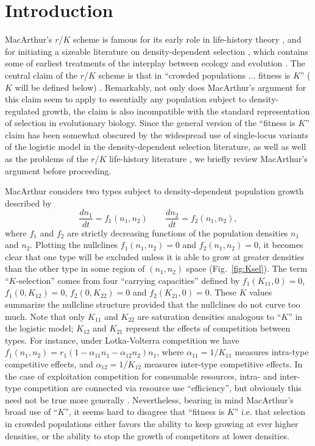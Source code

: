 \documentclass[11pt]{article}
\begin{document}
\section*{Introduction}



MacArthur's $r$/$K$ scheme \citep{macarthur_1962,macarthur_1967} is famous for its early role in life-history theory \citep{charlesworth_1994,reznick_2002}, and for initiating a sizeable literature on density-dependent selection \citep{christiansen_2004}, which contains some of earliest treatments of the interplay between ecology and evolution \citep{roughgarden_1979,travis_2013}. The central claim of the $r$/$K$ scheme is that in ``crowded populations ... fitness is $K$'' ($K$ will be defined below) \citep[pp. 149]{macarthur_1967}. Remarkably, not only does MacArthur's argument for this claim seem to apply to essentially any population subject to density-regulated growth, the claim is also incompatible with the standard representation of selection in evolutionary biology. Since the general version of the ``fitness is $K$'' claim has been somewhat obscured by the widespread use of single-locus variants of the logistic model in the density-dependent selection literature, as well as well as the problems of the $r$/$K$ life-history literature \cite[pp. 265]{charlesworth_1994}, we briefly review MacArthur's argument before proceeding.

MacArthur considers two types subject to density-dependent population growth described by
\begin{equation}
\frac{d n_1}{d t}=f_1(n_1,n_2)\qquad\frac{d n_2}{d t}=f_2(n_1,n_2), \label{eq:macgeneral}
\end{equation}
where $f_1$ and $f_2$ are strictly decreasing functions of the population densities $n_1$ and $n_2$. Plotting the nullclines $f_1(n_1,n_2)=0$ and $f_2(n_1,n_2)=0$, it becomes clear that one type will be excluded unless it is able to grow at greater densities than the other type in some region of $(n_1,n_2)$ space (Fig.~\ref{fig:Ksel}). The term ``$K$-selection'' comes from four ``carrying capacities'' defined by $f_1(K_{11},0)=0$, $f_1(0,K_{12})=0$, $f_2(0,K_{22})=0$ and $f_2(K_{21},0)=0$. These $K$ values summarize the nullcline structure provided that the nullclines do not curve too much. Note that only $K_{11}$ and $K_{22}$ are saturation densities analogous to ``$K$'' in the logistic model; $K_{12}$ and $K_{21}$ represent the effects of competition between types. For instance, under Lotka-Volterra competition we have $f_1(n_1,n_2)=r_1(1-\alpha_{11}n_1-\alpha_{12}n_2)n_1$, where $\alpha_{11}=1/K_{11}$ measures intra-type competitive effects, and $\alpha_{12}=1/K_{12}$ measures inter-type competitive effects. In the case of exploitation competition for consumable resources, intra- and inter-type competition are connected via resource use ``efficiency'', but obviously this need not be true more generally \citep{gill_1974,case_1974}. Nevertheless, bearing in mind MacArthur's broad use of ``$K$'', it seems hard to disagree that ``fitness is $K$'' i.e. that selection in crowded populations either favors the ability to keep growing at ever higher densities, or the ability to stop the growth of competitors at lower densities. 
\end{document}
